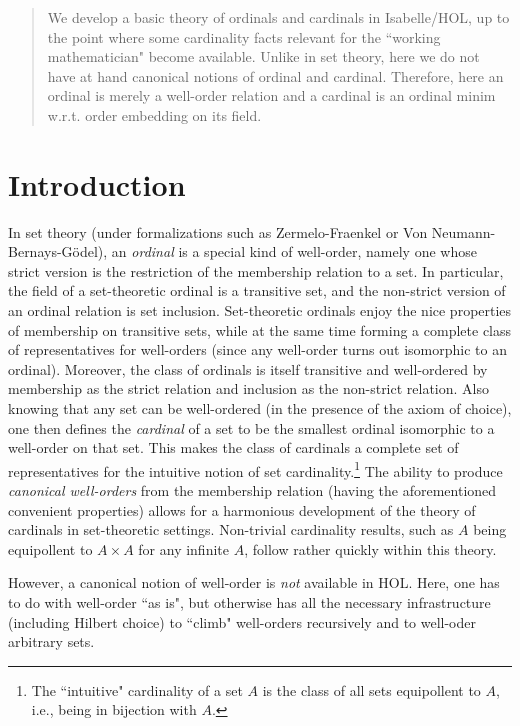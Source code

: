 \newcommand{\eqo}{\mbox{$=\!\!o$}}
\newcommand{\leqo}{\mbox{$\leq\!\!o$}}
\newcommand{\lesso}{\mbox{$<\!\!o$}}


\begin{abstract}
We develop a basic theory of ordinals and cardinals in Isabelle/HOL, up to the
point where some cardinality facts relevant for the ``working mathematician" become available.
Unlike in set theory, here we do not have at hand canonical notions of ordinal and cardinal.
Therefore, here an ordinal is merely a well-order relation and a cardinal is an
ordinal minim w.r.t. order embedding on its field.
\end{abstract}



\section{Introduction}

In set theory (under formalizations such as Zermelo-Fraenkel or Von Neumann-Bernays-G\"{o}del), an
{\em ordinal} is a special kind of well-order, namely one
whose strict version is the restriction of the membership relation to a set.  In particular,
the field of a set-theoretic ordinal is a transitive set, and the non-strict version
of an ordinal relation is set inclusion. Set-theoretic ordinals enjoy the nice properties
of membership on transitive sets, while at the same time forming a complete class of
representatives for well-orders (since any well-order turns out isomorphic to an ordinal).
Moreover, the class of ordinals is itself transitive and well-ordered by membership as the strict relation
and inclusion as the non-strict relation.
Also knowing that any set can be well-ordered (in the presence of the axiom of choice), one then defines
the {\em cardinal} of a set to be the smallest ordinal isomorphic to a well-order on that set.
This makes the class of cardinals a complete set of representatives for the intuitive notion
of set cardinality.\footnote{The ``intuitive" cardinality of a set $A$ is the class of all
sets equipollent to $A$, i.e., being in bijection with $A$.}
The ability to produce {\em canonical well-orders} from the membership relation (having the aforementioned
convenient properties)
allows for a harmonious development of the theory of cardinals in set-theoretic settings.
Non-trivial cardinality results, such as $A$ being equipollent to $A \times A$ for any infinite $A$,
follow rather quickly within this theory.

However, a canonical notion of well-order is {\em not} available in HOL.
Here, one has to do with well-order ``as is", but otherwise has all the necessary infrastructure
(including Hilbert choice) to ``climb" well-orders recursively and to well-oder arbitrary sets.

